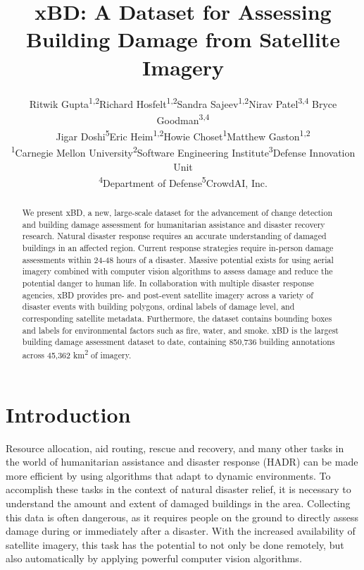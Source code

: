 \documentclass[10pt,twocolumn,letterpaper]{article}
\begin{document}
\title{xBD: A Dataset for Assessing Building Damage from Satellite Imagery}

\author{Ritwik Gupta\textsuperscript{1,2}\enspace Richard Hosfelt\textsuperscript{1,2}\enspace Sandra Sajeev\textsuperscript{1,2}\enspace Nirav Patel\textsuperscript{3,4} \enspace Bryce Goodman\textsuperscript{3,4}\enspace \\ Jigar Doshi\textsuperscript{5}\enspace Eric Heim\textsuperscript{1,2}\enspace Howie Choset\textsuperscript{1}\enspace Matthew Gaston\textsuperscript{1,2}\\
	\textsuperscript{1}Carnegie Mellon University\enspace \textsuperscript{2}Software Engineering Institute\enspace \textsuperscript{3}Defense Innovation Unit\\ \textsuperscript{4}Department of Defense\enspace \textsuperscript{5}CrowdAI, Inc.}

\maketitle


\begin{abstract}
We present xBD, a new, large-scale dataset for the advancement of change detection and building damage assessment for humanitarian assistance and disaster recovery research.
Natural disaster response requires an accurate understanding of damaged buildings in an affected region.
Current response strategies require in-person damage assessments within 24-48 hours of a disaster.
Massive potential exists for using aerial imagery combined with computer vision algorithms to assess damage and reduce the potential danger to human life.
In collaboration with multiple disaster response agencies, xBD provides pre- and post-event satellite imagery across a variety of disaster events with building polygons, ordinal labels of damage level, and corresponding satellite metadata.
Furthermore, the dataset contains bounding boxes and labels for environmental factors such as fire, water, and smoke.
xBD is the largest building damage assessment dataset to date, containing 850,736 building annotations across 45,362 km\textsuperscript{2} of imagery.
\end{abstract}

\vspace{-0.5cm}
\section{Introduction}
Resource allocation, aid routing,  rescue and recovery, and many other tasks in the world of humanitarian assistance and disaster response (HADR) can be made more efficient by using algorithms that  adapt to dynamic environments.
To accomplish these tasks in the context of natural disaster relief, it is necessary to understand the amount and extent of damaged buildings in the area.
Collecting this data is often dangerous, as it requires people on the ground to directly assess damage during or immediately after a disaster.
With the increased availability of satellite imagery, this task has the potential to not only be done remotely, but also automatically by applying powerful computer vision algorithms.
\end{document}
